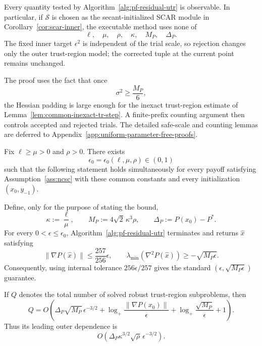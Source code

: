 Every quantity tested by Algorithm~\ref{alg:pf-residual-utr} is
observable. In particular, if $\mathcal S$ is chosen as the
secant-initialized SCAR module in Corollary~\ref{cor:scar-inner},
the executable method uses none of
\[
    \ell,\quad
    \mu,\quad
    \rho,\quad
    \kappa,\quad
    M_P,\quad
    \Delta_P.
\]
The fixed inner target $\epsilon^2$ is independent of the trial scale,
so rejection changes only the outer trust-region model; the corrected
tuple at the current point remains unchanged.

The proof uses the fact that once
\[
    \sigma^2\ge\frac{M_P}{6},
\]
the Hessian padding is large enough for the inexact trust-region
estimate of Lemma~\ref{lem:common-inexact-tr-step}. A finite-prefix
counting argument then controls accepted and rejected trials.
The detailed safe-scale and counting lemmas are deferred to
Appendix~\ref{app:uniform-parameter-free-proofs}.

\begin{theorem}
\label{thm:pf-scar-utr}
Fix $\ell\ge\mu>0$ and $\rho>0$.
There exists
\[
    \epsilon_0
    =
    \epsilon_0(\ell,\mu,\rho)
    \in(0,1)
\]
such that the following statement holds simultaneously for every
payoff satisfying Assumption~\ref{ass:ncsc} with these common
constants and every initialization $(x_0,y_{-1})$.

Define, only for the purpose of stating the bound,
\[
    \kappa:=\frac{\ell}{\mu},
    \qquad
    M_P:=4\sqrt2\,\kappa^3\rho,
    \qquad
    \Delta_P:=P(x_0)-P^*.
\]
For every $0<\epsilon\le\epsilon_0$,
Algorithm~\ref{alg:pf-residual-utr} terminates and returns
$\widehat x$ satisfying
\begin{equation}
    \|\nabla P(\widehat x)\|
    \le
    \frac{257}{256}\epsilon,
    \qquad
    \lambda_{\min}(\nabla^2P(\widehat x))
    \ge
    -\sqrt{M_P\epsilon}.
    \label{eq:pf-return}
\end{equation}
Consequently, using internal tolerance $256\epsilon/257$ gives the
standard
$(\epsilon,\sqrt{M_P\epsilon})$ guarantee.

If $Q$ denotes the total number of solved robust trust-region
subproblems, then
\begin{equation}
    Q
    =
    O\!\left(
        \Delta_P\sqrt{M_P}\,
        \epsilon^{-3/2}
        +
        \log_+
        \frac{\|\nabla P(x_0)\|}{\epsilon}
        +
        \log_+
        \frac{\sqrt{M_P}}{\epsilon}
        +1
    \right).
    \label{eq:pf-outer-complexity}
\end{equation}
Thus its leading outer dependence is
\begin{equation}
    O\!\left(
        \Delta_P
        \kappa^{3/2}\sqrt\rho\,
        \epsilon^{-3/2}
    \right).
    \label{eq:pf-outer-leading}
\end{equation}
\end{theorem}

